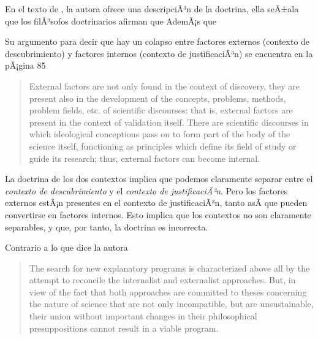 \noindent En el texto de \textcite[p.75]{Yturbe1995}, la autora ofrece una descripciÃ³n de la doctrina, ella seÃ±ala que los filÃ³sofos doctrinarios afirman que 
AdemÃ¡s que 


Su argumento para decir que hay un colapso entre factores externos (contexto de descubrimiento) y factores internos (contexto de justificaciÃ³n) se encuentra en la pÃ¡gina 85

\begin{quote}

	External factors are not only found in the context of discovery, they are present also in the development of the concepts, problems, methods, problem fields, etc. of scientific discourses: that is, external factors are present in the context of validation itself.
	There are scientific discourses in which ideological conceptions pass on to form part of the body of the science itself, functioning as principles which define its field of study or guide its research; thus, external factors can become internal.

\end{quote}

La doctrina de los dos contextos implica que podemos claramente separar entre el \emph{contexto de descubrimiento} y el \emph{contexto de justificaciÃ³n}.
Pero los factores externos estÃ¡n presentes en el contexto de justificaciÃ³n, tanto asÃ­ que pueden convertirse en factores internos.
Esto implica que los contextos no son claramente separables, y que, por tanto, la doctrina es incorrecta.

Contrario a lo que dice la autora

\begin{quote}
	The search for new explanatory programs is characterized above all by the attempt to reconcile the internalist and externalist approaches. But, in view of the fact that both approaches are committed to theses concerning the nature of science that are not only incompatible, but are unsustainable, their union without important changes in their philosophical presuppositions cannot result in a viable program. \parencite[p. 79]{Yturbe1995}
\end{quote}

